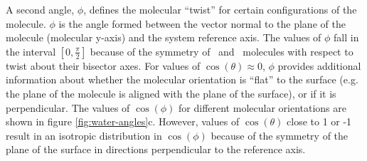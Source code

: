 	A second angle, $\phi$, defines the molecular ``twist'' for certain configurations of the molecule. $\phi$ is the angle formed between the vector normal to the plane of the molecule (molecular y-axis) and the system reference axis. The values of $\phi$ fall in the interval $[0,\frac{\pi}{2}]$ because of the symmetry of \wat~and \suldiox~molecules with respect to twist about their bisector axes. For values of $\cos(\theta) \approx 0$, $\phi$ provides additional information about whether the molecular orientation is ``flat'' to the surface (e.g. the plane of the molecule is aligned with the plane of the surface), or if it is perpendicular. The values of $\cos(\phi)$ for different molecular orientations are shown in figure \ref{fig:water-angles}c. %
	However, values of $\cos(\theta)$ close to 1 or -1 result in an isotropic distribution in $\cos(\phi)$ because of the symmetry of the plane of the surface in directions perpendicular to the reference axis.


